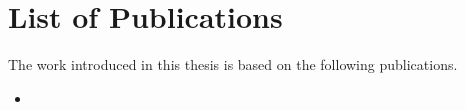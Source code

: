 \newpage
\chapter*{List of Publications}

The work introduced in this thesis is based on the following publications.

\begin{itemize}

\item %

\end{itemize}